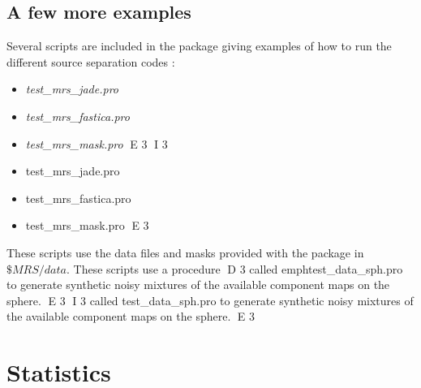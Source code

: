 \subsection{A few more examples}

Several scripts are included in the package giving examples of how to run the different source separation codes : 
\begin{itemize}
D 3
\item{\emph{test\_mrs\_jade.pro}}
\item{\emph{test\_mrs\_fastica.pro}}
\item{\emph{test\_mrs\_mask.pro}}
E 3
I 3
\item{test\_mrs\_jade.pro}
\item{test\_mrs\_fastica.pro}
\item{test\_mrs\_mask.pro}
E 3
\end{itemize}
These scripts use the data files and masks provided with the package in $\$MRS/data$. These scripts use a procedure 
D 3
called emph{test\_data\_sph.pro} to generate synthetic noisy mixtures of the available component maps on the sphere.
E 3
I 3
called test\_data\_sph.pro to generate synthetic noisy mixtures of the available component maps on the sphere.
E 3



\section{Statistics}

